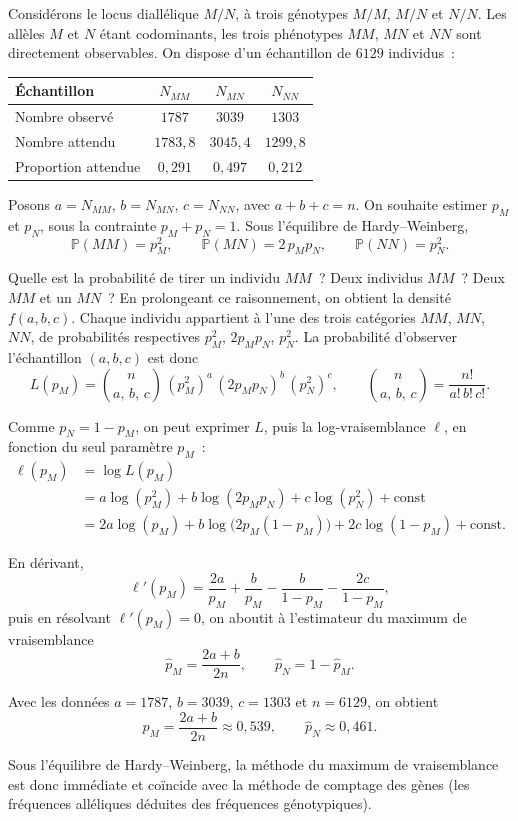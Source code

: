 \begin{exemple}
Considérons le locus diallélique $M/N$, à trois génotypes $M\!/\!M$, $M\!/\!N$
et $N\!/\!N$. Les allèles $M$ et $N$ étant codominants, les trois phénotypes
$MM$, $MN$ et $NN$ sont directement observables. On dispose d'un échantillon de
$6129$ individus~:

\begin{center}
\begin{tabular}{lccc}
\hline
Échantillon & $N_{MM}$ & $N_{MN}$ & $N_{NN}$ \\
\hline
Nombre observé      & $1787$   & $3039$   & $1303$ \\
Nombre attendu      & $1783{,}8$ & $3045{,}4$ & $1299{,}8$ \\
Proportion attendue & $0{,}291$  & $0{,}497$  & $0{,}212$ \\
\hline
\end{tabular}
\end{center}

Posons $a = N_{MM}$, $b = N_{MN}$, $c = N_{NN}$, avec $a + b + c = n$. On souhaite
estimer $p_M$ et $p_N$, sous la contrainte $p_M + p_N = 1$. Sous l'équilibre de
Hardy--Weinberg,
$$
\mathbb{P}(MM) = p_M^2, \qquad \mathbb{P}(MN) = 2\, p_M p_N, \qquad
\mathbb{P}(NN) = p_N^2 .
$$

Quelle est la probabilité de tirer un individu $MM$~? Deux individus $MM$~? Deux
$MM$ et un $MN$~? En prolongeant ce raisonnement, on obtient la densité
$f(a,b,c)$. Chaque individu appartient à l'une des trois catégories $MM$, $MN$,
$NN$, de probabilités respectives $p_M^2$, $2 p_M p_N$, $p_N^2$. La probabilité
d'observer l'échantillon $(a,b,c)$ est donc
$$
L(p_M) = \binom{n}{a,\,b,\,c}\, (p_M^2)^a\, (2 p_M p_N)^b\, (p_N^2)^c,
\qquad
\binom{n}{a,\,b,\,c} = \frac{n!}{a!\, b!\, c!} .
$$

Comme $p_N = 1 - p_M$, on peut exprimer $L$, puis la log-vraisemblance $\ell$,
en fonction du seul paramètre $p_M$~:
\begin{align*}
\ell(p_M) &= \log L(p_M) \\
&= a \log(p_M^2) + b \log(2 p_M p_N) + c \log(p_N^2) + \text{const} \\
&= 2a \log(p_M) + b \log\!\big(2 p_M (1 - p_M)\big) + 2c \log(1 - p_M)
   + \text{const}.
\end{align*}

En dérivant,
$$
\ell'(p_M) = \frac{2a}{p_M} + \frac{b}{p_M} - \frac{b}{1 - p_M}
             - \frac{2c}{1 - p_M},
$$
puis en résolvant $\ell'(p_M) = 0$, on aboutit à l'estimateur du maximum de
vraisemblance
$$
\hat{p}_M = \frac{2a + b}{2n}, \qquad \hat{p}_N = 1 - \hat{p}_M .
$$

Avec les données $a = 1787$, $b = 3039$, $c = 1303$ et $n = 6129$, on obtient
$$
\hat{p}_M = \frac{2a + b}{2n} \approx 0{,}539, \qquad
\hat{p}_N \approx 0{,}461 .
$$

Sous l'équilibre de Hardy--Weinberg, la méthode du maximum de vraisemblance est
donc immédiate et coïncide avec la méthode de comptage des gènes (les fréquences
alléliques déduites des fréquences génotypiques).
\end{exemple}


